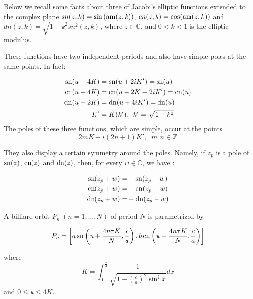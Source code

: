 Below we recall some   facts about three of Jacobi's elliptic functions extended to the complex plane $sn(z,k)=\sin{(\mathrm{am}(z,k))}$, $cn(z,k)=\cos(\mathrm{am}(z,k))$ and $dn(z,k)=\sqrt{1-k^2sn^2(z,k)}$, where $z \in \mathbb{C}$, and $0<k<1$ is the elliptic modulus. 

These functions have two independent periods and also have simple poles at the same points. In fact:

\begin{align*}
    \mathrm{sn}(u+4K)&=\mathrm{sn}(u+2iK')=\mathrm{sn}(u)\\
    \mathrm{cn}(u+4K)&=\mathrm{cn}(u+2K+2iK')=\mathrm{cn}(u)\\
    \mathrm{dn}(u+2K)&=\mathrm{dn}(u+4iK')=\mathrm{dn}(u)\\
    K'&=K(k'), \;\;k'=\sqrt{1-k^2}
\end{align*}
The  poles of these three functions, which are simple, occur at the points
\[2mK+i(2n+1)K'
,\;\; m,n\in \mathbb{Z}\]

They also display a certain symmetry around the poles. Namely, if $z_p$ is a pole of $\mathrm{sn}(z)$, $\mathrm{cn}(z)$ and $\mathrm{dn}(z)$, then, for every $w \in \mathbb{C}$, we have \cite[Chapter 2]{armitage-2006}:

\begin{align}
\mathrm{sn}(z_p+w)=&-\mathrm{sn}(z_p-w) \nonumber \\
\mathrm{cn}(z_p+w)=&-\mathrm{cn}(z_p-w)  \label{eqn:zpole} \\
\mathrm{dn}(z_p+w)=&-\mathrm{dn}(z_p-w) \nonumber
\end{align}


\begin{proposition}
A billiard orbit $P_n$ $(n=1,\ldots, N) $ of period $N$ is parametrized by

\[ 
P_n=
\left[a\,\mathrm{sn}  \left(u+\frac{4n\tau K}{N}, \frac{c}{a}\right) , b\,\mathrm{cn}  \left(u+\frac{4n\tau K}{N}, \frac{c}{a}\right)\right]
\]
 
where
\[ K=\int_{0}^{\frac{\pi}{2}} \frac {1}{\sqrt {1-(\frac{c}{a})^{2}   \sin^2 x  
}}dx\]
and $0\leq u\leq 4K.$
\end{proposition}
